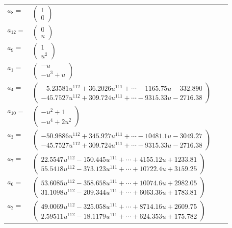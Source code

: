 \documentclass[1p]{elsarticle_modified}
\theoremstyle{definition}
\begin{document}
\begin{tabular}{m{7pt} m{180pt} m{7pt} m{180pt} }
\flushright $a_{8}=$&$\begin{pmatrix}1\\0\end{pmatrix}$ \\
\flushright $a_{12}=$&$\begin{pmatrix}0\\u\end{pmatrix}$ \\
\flushright $a_{9}=$&$\begin{pmatrix}1\\u^2\end{pmatrix}$ \\
\flushright $a_{1}=$&$\begin{pmatrix}- u\\- u^3+u\end{pmatrix}$ \\
\flushright $a_{4}=$&$\begin{pmatrix}-5.23581 u^{112}+36.2026 u^{111}+\cdots-1165.75 u-332.890\\-45.7527 u^{112}+309.724 u^{111}+\cdots-9315.33 u-2716.38\end{pmatrix}$ \\
\flushright $a_{10}=$&$\begin{pmatrix}- u^2+1\\- u^4+2 u^2\end{pmatrix}$ \\
\flushright $a_{3}=$&$\begin{pmatrix}-50.9886 u^{112}+345.927 u^{111}+\cdots-10481.1 u-3049.27\\-45.7527 u^{112}+309.724 u^{111}+\cdots-9315.33 u-2716.38\end{pmatrix}$ \\
\flushright $a_{7}=$&$\begin{pmatrix}22.5547 u^{112}-150.445 u^{111}+\cdots+4155.12 u+1233.81\\55.5418 u^{112}-373.123 u^{111}+\cdots+10722.4 u+3159.25\end{pmatrix}$ \\
\flushright $a_{6}=$&$\begin{pmatrix}53.6085 u^{112}-358.658 u^{111}+\cdots+10074.6 u+2982.05\\31.1098 u^{112}-209.344 u^{111}+\cdots+6063.36 u+1783.81\end{pmatrix}$ \\
\flushright $a_{2}=$&$\begin{pmatrix}49.0069 u^{112}-325.058 u^{111}+\cdots+8714.16 u+2609.75\\2.59511 u^{112}-18.1179 u^{111}+\cdots+624.353 u+175.782\end{pmatrix}$ \\

\end{tabular}
\end{document}
